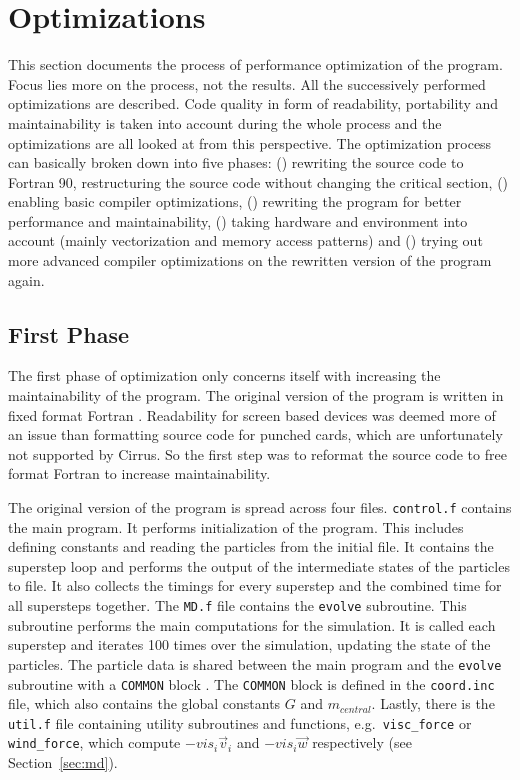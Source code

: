 \documentclass[twoside,11pt]{article}
\begin{document}

\section{Optimizations} %
\label{sec:opt}

This section documents the process of performance optimization of the
program.
Focus lies more on the process, not the results.
All the successively performed optimizations are described.
Code quality in form of readability, portability and maintainability
is taken into account during the whole process and the optimizations
are all looked at from this perspective.
The optimization process can basically broken down into five phases:
() rewriting the source code to Fortran 90,
restructuring the source code without changing the critical section,
() enabling basic compiler optimizations,
() rewriting the program for better performance and
maintainability, () taking hardware and environment
into account (mainly vectorization and memory access patterns) and
() trying out more advanced compiler optimizations on
the rewritten version of the program again.

\subsection{First Phase} %
\label{subsec:p1}

The first phase of optimization only concerns itself with increasing
the maintainability of the program.
The original version of the program is written in fixed format
Fortran \citep[see e.g.][for free vs.\ fixed format Fortran]
{fortran_free_fixed}.
Readability for screen based devices was deemed more of an issue than
formatting source code for punched cards, which are unfortunately not
supported by Cirrus.
So the first step was to reformat the source code to free format
Fortran to increase maintainability.

The original version of the program is spread across four files.
\texttt{control.f} contains the main program.
It performs initialization of the program.
This includes defining constants and reading the particles from the
initial file.
It contains the superstep loop and performs the output of the
intermediate states of the particles to file.
It also collects the timings for every superstep and the combined
time for all supersteps together.
The \texttt{MD.f} file contains the \texttt{evolve} subroutine.
This subroutine performs the main computations for the simulation.
It is called each superstep and iterates 100 times over the
simulation, updating the state of the particles.
The particle data is shared between the main program and the
\texttt{evolve} subroutine with a \texttt{COMMON} block
\citep[see e.g.][]{fortran_common}.
The \texttt{COMMON} block is defined in the \texttt{coord.inc} file,
which also contains the global constants $G$ and $m_{central}$.
Lastly, there is the \texttt{util.f} file containing utility
subroutines and functions, e.g.\ \texttt{visc\_force} or
\texttt{wind\_force}, which compute $-vis_i\vec{v}_i$ and
$-vis_i\vec{w}$ respectively (see Section~\ref{sec:md}).
\end{document}
